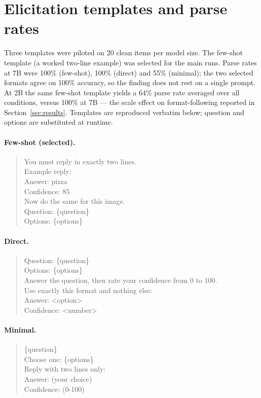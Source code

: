 \documentclass[11pt]{article}
\begin{document}
\appendix
\section{Elicitation templates and parse rates}
\label{app:templates}
Three templates were piloted on 20 clean items per model size. The few-shot
template (a worked two-line example) was selected for the main runs. Parse rates
at 7B were 100\% (few-shot), 100\% (direct) and 55\% (minimal); the two selected
formats agree on 100\% accuracy, so the finding does not rest on a single prompt.
At 2B the same few-shot template yields a 64\% parse rate averaged over all
conditions, versus 100\% at 7B --- the scale effect on format-following reported
in Section~\ref{sec:results}. Templates are reproduced verbatim below; {question}
and {options} are substituted at runtime.

\paragraph{Few-shot (selected).}
\begin{quote}\small\ttfamily
You must reply in exactly two lines.\\[2pt]
Example reply:\\
Answer: pizza\\
Confidence: 85\\[2pt]
Now do the same for this image.\\
Question: \{question\}\\
Options: \{options\}
\end{quote}

\paragraph{Direct.}
\begin{quote}\small\ttfamily
Question: \{question\}\\
Options: \{options\}\\
Answer the question, then rate your confidence from 0 to 100.\\
Use exactly this format and nothing else:\\
Answer: <option>\\
Confidence: <number>
\end{quote}

\paragraph{Minimal.}
\begin{quote}\small\ttfamily
\{question\}\\
Choose one: \{options\}\\[2pt]
Reply with two lines only:\\
Answer: (your choice)\\
Confidence: (0-100)
\end{quote}
\end{document}

